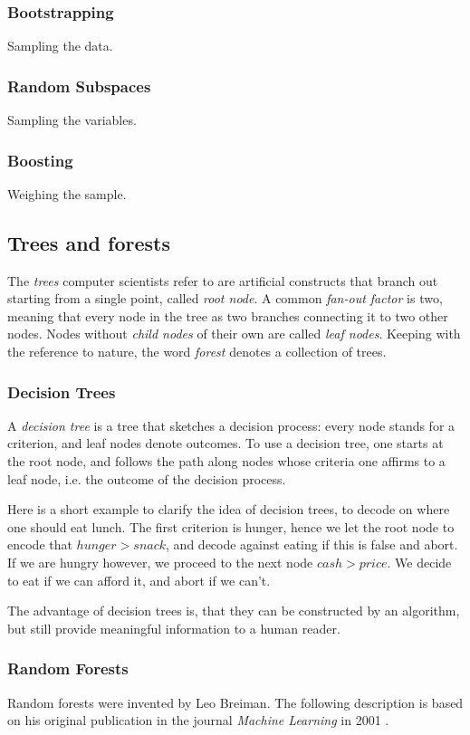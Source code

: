 \documentclass[a4paper,man,12pt,apacite]{apa6} %
\begin{document}
\subsubsection{Bootstrapping}
Sampling the data.

\subsubsection{Random Subspaces}
Sampling the variables.

\subsubsection{Boosting}
Weighing the sample.

\subsection{Trees and forests}
The \emph{trees} computer scientists refer to are artificial constructs that
branch out starting from a single point, called \emph{root node}.
A common \emph{fan-out factor} is two, meaning that every node in the tree
as two branches connecting it to two other nodes.
Nodes without \emph{child nodes} of their own are called \emph{leaf nodes}.
Keeping with the reference to nature, the word \emph{forest} denotes a
collection of trees.

\subsubsection{Decision Trees}
A \emph{decision tree} is a tree that sketches a decision process: every
node stands for a criterion, and leaf nodes denote outcomes.
To use a decision tree, one starts at the root node, and follows the path
along nodes whose criteria one affirms to a leaf node, i.e. the outcome of
the decision process.

Here is a short example to clarify the idea of decision trees, to decode
on where one should eat lunch.
The first criterion is hunger, hence we let the root node to encode that
\( hunger > snack \), and decode against eating if this is false and abort.
If we are hungry however, we proceed to the next node \( cash > price \).
We decide to eat if we can afford it, and abort if we can't.

The advantage of decision trees is, that they can be constructed by an
algorithm, but still provide meaningful information to a human reader.

\subsubsection{Random Forests}
Random forests were invented by Leo Breiman.
The following description is based on his original publication in the
journal \emph{Machine Learning} in 2001 \cite{breiman2001random}.
\end{document}
